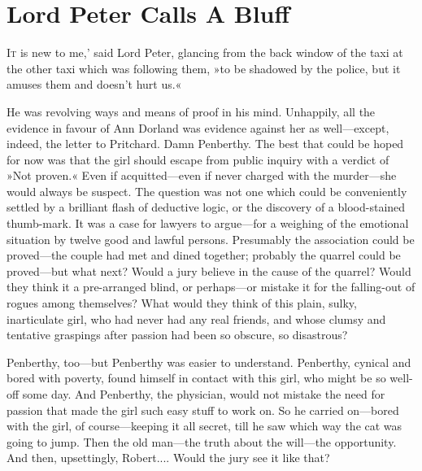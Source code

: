 \chapter{Lord Peter Calls A Bluff}

\lettrine[lines=4,ante=‘]{I}{t} is new to me,' said Lord Peter, glancing from the back window of the taxi at the other taxi which was following them, »to be shadowed by the police, but it amuses them and doesn't hurt us.«

He was revolving ways and means of proof in his mind. Unhappily, all the evidence in favour of Ann Dorland was evidence against her as well\allowbreak---\allowbreak except, indeed, the letter to Pritchard. Damn Penberthy. The best that could be hoped for now was that the girl should escape from public inquiry with a verdict of »Not proven.« Even if acquitted\allowbreak---\allowbreak even if never charged with the murder\allowbreak---\allowbreak she would always be suspect. The question was not one which could be conveniently settled by a brilliant flash of deductive logic, or the discovery of a blood-stained thumb-mark. It was a case for lawyers to argue\allowbreak---\allowbreak for a weighing of the emotional situation by twelve good and lawful persons. Presumably the association could be proved\allowbreak---\allowbreak the couple had met and dined together; probably the quarrel could be proved\allowbreak---\allowbreak but what next? Would a jury believe in the cause of the quarrel? Would they think it a pre-arranged blind, or perhaps\allowbreak---\allowbreak or mistake it for the falling-out of rogues among themselves? What would they think of this plain, sulky, inarticulate girl, who had never had any real friends, and whose clumsy and tentative graspings after passion had been so obscure, so disastrous?

Penberthy, too\allowbreak---\allowbreak but Penberthy was easier to understand. Penberthy, cynical and bored with poverty, found himself in contact with this girl, who might be so well-off some day. And Penberthy, the physician, would not mistake the need for passion that made the girl such easy stuff to work on. So he carried on\allowbreak---\allowbreak bored with the girl, of course\allowbreak---\allowbreak keeping it all secret, till he saw which way the cat was going to jump. Then the old man\allowbreak---\allowbreak the truth about the will\allowbreak---\allowbreak the opportunity. And then, upsettingly, Robert.... Would the jury see it like that?

